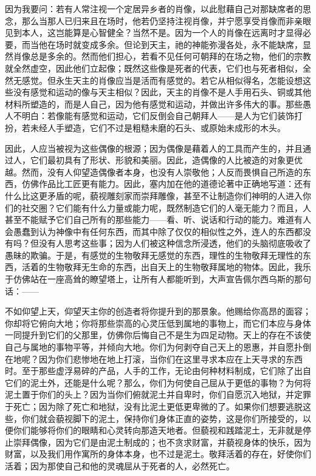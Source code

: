 因为我要问：若有人常注视一个定居异乡者的肖像，以此慰藉自己对那缺席者的思念，那么当那人已归来且在场时，他若仍坚持注视肖像，并宁愿享受肖像而非亲眼见到本人，这岂能算是心智健全？当然不是。因为一个人的肖像在远离时才显得必要，而当他在场时就变成多余。但论到天主，祂的神能弥漫各处，永不能缺席，显然肖像总是多余的。然而他们担心，若看不见任何可朝拜的在场之物，他们的宗教就全然虚空，因此他们立起像；既然这些像是死者的代表，它们也与死者相似，全然无感觉。但永生天主的肖像应当是活而有感觉的。若它从相似得名，怎能设想这些没有感觉和运动的像与天主相似？因此，天主的肖像不是人手用石头、铜或其他材料所塑造的，而是人自己，因为他有感觉和运动，并做出许多伟大的事。那些愚人不明白：若像能有感觉和运动，它们反倒会自己朝拜人——是人为它们装饰打扮，若未经人手塑造，它们不过是粗糙未磨的石头、或原始未成形的木头。\par

因此，人应当被视为这些偶像的根源；因为偶像是藉着人的工具而产生的，并且通过人，它们最初具有了形状、形貌和美丽。因此，造偶像的人比被造的对象更优越。然而，没有人仰望造偶像者本身，也没有人崇敬他；人反而畏惧自己所造的东西，仿佛作品比工匠更有能力。因此，塞内加在他的道德论著中正确地写道：还有什么比这更矛盾的呢，藐视雕刻家而崇拜雕像，甚至不让制造你们神明的人进入你们的社交圈？它们能有什么力量或能力呢，既然制造它们的人毫无能力？而且，人甚至不能赋予它们自己所有的那些能力——看、听、说话和行动的能力。难道有人会愚蠢到认为神像中有任何东西，而其中除了仅仅的相似性之外，连人的东西都没有吗？但没有人思考这些事；因为人们被这种信念所浸透，他们的头脑彻底吸收了愚昧的欺骗。于是，有感觉的生物敬拜无感觉的东西，理性的生物敬拜无理性的东西，活着的生物敬拜无生命的东西，出自天上的生物敬拜属地的物体。因此，我乐于仿佛站在一座高耸的瞭望塔上，让所有人都能听到，大声宣告佩尔西乌斯的那句话：——\par

\par

不如仰望上天，仰望天主你的创造者将你提升到的那景象。他赐给你高昂的面容；你却将它俯向大地；你将那些崇高的心灵压低到属地的事物上，而它们本应与身体一同提升到它们的父那里，仿佛你后悔自己不是生为四足动物。天上的存在不该使自己与属地的事物平等，并倾向大地。你们为何剥夺自己天上的恩惠，并自愿扑倒在地呢？因为你们悲惨地在地上打滚，当你们在这里寻求本应在上天寻求的东西时。至于那些虚浮易碎的产品，人手的工作，无论由何种材料制成，它们除了出自它们的泥土外，还能是什么呢？那么，你们为何使自己屈从于更低的事物？为何将泥土置于你们的头上？因为当你们俯就泥土并自卑时，你们自愿沉入地狱，并定罪于死亡；因为除了死亡和地狱，没有比泥土更低更卑微的了。如果你们想要逃脱这些，你们就会藐视脚下的泥土，保持你们身体正直的姿势，这是你们所接受的，以便你们能够将你们的眼睛和心灵转向那造天地者。但藐视和践踏泥土，无非就是停止崇拜偶像，因为它们是由泥土制成的；也不贪求财富，并藐视身体的快乐，因为财富，以及我们用作寓所的身体本身，也不过是泥土。敬拜活着的存在，好使你们活着；因为那使自己和他的灵魂屈从于死者的人，必然死亡。\par

